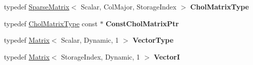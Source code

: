 \begin{DoxyCompactItemize}
\mbox{\label{class_eigen_1_1_simplicial_cholesky_base_addfb5032ff8efea57e3576d96326e822}} 
typedef \mbox{\hyperlink{class_eigen_1_1_sparse_matrix}{Sparse\+Matrix}}$<$ Scalar, Col\+Major, Storage\+Index $>$ {\bfseries Chol\+Matrix\+Type}
\item 
\mbox{\label{class_eigen_1_1_simplicial_cholesky_base_a2980c8f7ae5c6c19c4f2fc428be249e4}} 
typedef \mbox{\hyperlink{class_eigen_1_1_sparse_matrix}{Chol\+Matrix\+Type}} const  $\ast$ {\bfseries Const\+Chol\+Matrix\+Ptr}
\item 
\mbox{\label{class_eigen_1_1_simplicial_cholesky_base_a9ac3cfb0b045fd84e4fe6bfcd627f582}} 
typedef \mbox{\hyperlink{class_eigen_1_1_matrix}{Matrix}}$<$ Scalar, Dynamic, 1 $>$ {\bfseries Vector\+Type}
\item 
\mbox{\label{class_eigen_1_1_simplicial_cholesky_base_a60a6f0c73dfa90d8a5b679dd0469374a}} 
typedef \mbox{\hyperlink{class_eigen_1_1_matrix}{Matrix}}$<$ Storage\+Index, Dynamic, 1 $>$ {\bfseries VectorI}
\end{DoxyCompactItemize}
